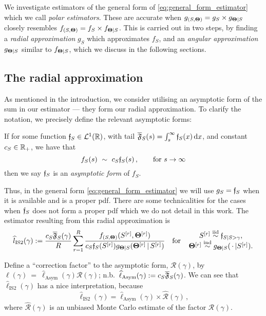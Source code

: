 We investigate estimators of the general form of \eqref{eq:general_form_estimator} which we call \emph{polar estimators}.
These are accurate when $g_{(S,\bm{\Theta})}= g_S \times g_{\bm{\Theta} \mid S}$ closely resembles $f_{(S,\bm{\Theta})}=f_S \times f_{\bm{\Theta} \mid S}$.
This is carried out in two steps, by finding a \emph{radial approximation} $g_S$ which approximates $f_S$, and an \emph{angular approximation} $g_{\bm{\Theta} \mid S}$ similar to $f_{\bm{\Theta} \mid S}$, which we discuss in the following sections.


\subsection{The radial approximation}

As mentioned in the introduction, we consider utilising an asymptotic form of the sum in our estimator --- they form our radial approximation. To clarify the notation, we precisely define the relevant asymptotic forms:

\begin{definition}
If for some function $\mathfrak{f}_S \in \mathcal{L}^1(\mathbb{R})$, with tail $\overline{\mathfrak{F}}_S(s) = \int_s^\infty \mathfrak{f}_S(x) \mathop{}\!\mathrm{d} x$, and constant $c_S \in \mathbb{R}_+$, we have that
\begin{equation} \label{asymptotic_sum}
  f_S(s)\ \sim\ c_S \mathfrak{f}_S(s) \,,\qquad \text{for } s \to \infty
\end{equation}
then we say $\mathfrak{f}_S$ is an \emph{asymptotic form} of $f_S$. \remQED
\end{definition}

Thus, in the general form \eqref{eq:general_form_estimator} we will use $g_S = \mathfrak{f}_S$ when it is available and is a proper pdf. There are some technicalities for the cases when $\mathfrak{f}_S$ does not form a proper pdf which we do not detail in this work.
The estimator resulting from this radial approximation is
\begin{equation} \label{eq:asymptotic_estimator}
\hat{l}_{\mathrm{IS2}}(\gamma) := \frac{c_S \AsymFTail(\gamma)}{R} \sum_{r=1}^R \frac{ f_{(S,\bfTheta)}(S^{[r]}, \bfTheta^{[r]}) }{ c_S \Asymf( S^{[r]} )g_{\bfTheta \mid S}(\bfTheta^{[r]}\,|\, S^{[r]})}
\quad \text{for} \quad
\genfrac{}{}{0pt}{}{S^{[r]} \iidDist \AsymfTrun, }{ \bfTheta^{[r]} \indDist g_{\bfTheta \mid S}( \,\cdot\, | S^{[r]}). }
\end{equation}

\begin{remark}
Define a ``correction factor'' to the asymptotic form, $\mathcal{R}(\gamma)$, by
$ \ell(\gamma)~=~\hat{\ell}_{\mathrm{Asym}}(\gamma) \mathcal{R}(\gamma) $; n.b.\ $\widehat{\ell}_{\mathrm{Asym}}(\gamma) := c_S \overline{\mathfrak{F}}_S(\gamma)$.
We can see that $\hat{\ell}_{\mathrm{IS2}}(\gamma)$ has a nice interpretation, because
\[ \hat{\ell}_{\mathrm{IS2}}(\gamma) = \hat{\ell}_{\mathrm{Asym}}(\gamma) \times \hat{\mathcal{R}}(\gamma) \,, \]
where $\hat{\mathcal{R}}(\gamma)$ is an unbiased Monte Carlo estimate of the factor $\mathcal{R}(\gamma)$. \remQED
\end{remark}

